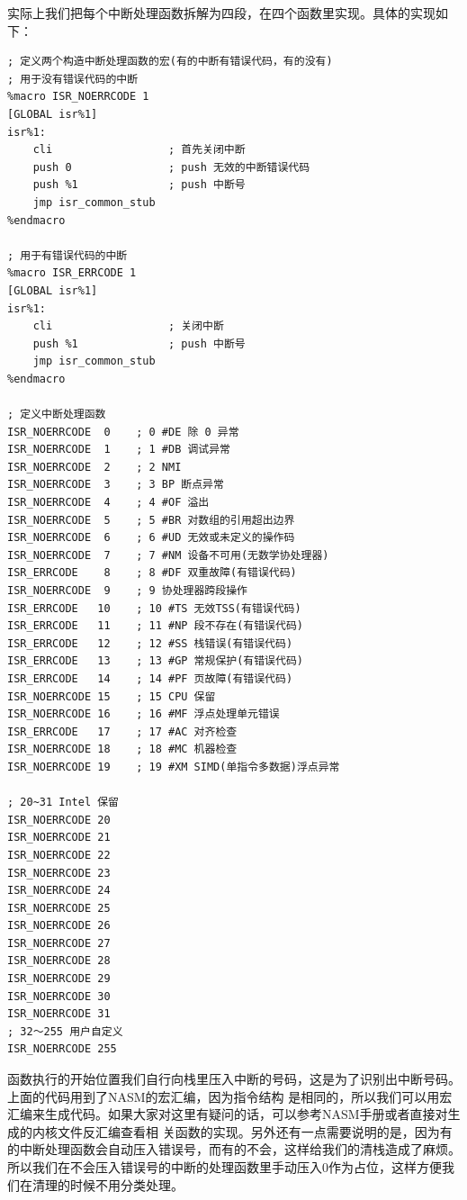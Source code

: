 \par 实际上我们把每个中断处理函数拆解为四段，在四个函数里实现。具体的实现如下：

\begin{lstlisting}[language = {[x86masm]Assembler}, caption = idt/idt\_s.s]
; 定义两个构造中断处理函数的宏(有的中断有错误代码，有的没有)
; 用于没有错误代码的中断
%macro ISR_NOERRCODE 1
[GLOBAL isr%1]
isr%1:
	cli                  ; 首先关闭中断
	push 0               ; push 无效的中断错误代码
	push %1              ; push 中断号
	jmp isr_common_stub
%endmacro

; 用于有错误代码的中断
%macro ISR_ERRCODE 1
[GLOBAL isr%1]
isr%1:
	cli                  ; 关闭中断
	push %1              ; push 中断号
	jmp isr_common_stub
%endmacro

; 定义中断处理函数
ISR_NOERRCODE  0 	; 0 #DE 除 0 异常
ISR_NOERRCODE  1 	; 1 #DB 调试异常
ISR_NOERRCODE  2 	; 2 NMI
ISR_NOERRCODE  3 	; 3 BP 断点异常 
ISR_NOERRCODE  4 	; 4 #OF 溢出 
ISR_NOERRCODE  5 	; 5 #BR 对数组的引用超出边界 
ISR_NOERRCODE  6 	; 6 #UD 无效或未定义的操作码 
ISR_NOERRCODE  7 	; 7 #NM 设备不可用(无数学协处理器) 
ISR_ERRCODE    8 	; 8 #DF 双重故障(有错误代码) 
ISR_NOERRCODE  9 	; 9 协处理器跨段操作
ISR_ERRCODE   10 	; 10 #TS 无效TSS(有错误代码) 
ISR_ERRCODE   11 	; 11 #NP 段不存在(有错误代码) 
ISR_ERRCODE   12 	; 12 #SS 栈错误(有错误代码) 
ISR_ERRCODE   13 	; 13 #GP 常规保护(有错误代码) 
ISR_ERRCODE   14 	; 14 #PF 页故障(有错误代码) 
ISR_NOERRCODE 15 	; 15 CPU 保留 
ISR_NOERRCODE 16 	; 16 #MF 浮点处理单元错误 
ISR_ERRCODE   17 	; 17 #AC 对齐检查 
ISR_NOERRCODE 18 	; 18 #MC 机器检查 
ISR_NOERRCODE 19 	; 19 #XM SIMD(单指令多数据)浮点异常

; 20~31 Intel 保留
ISR_NOERRCODE 20
ISR_NOERRCODE 21
ISR_NOERRCODE 22
ISR_NOERRCODE 23
ISR_NOERRCODE 24
ISR_NOERRCODE 25
ISR_NOERRCODE 26
ISR_NOERRCODE 27
ISR_NOERRCODE 28
ISR_NOERRCODE 29
ISR_NOERRCODE 30
ISR_NOERRCODE 31
; 32～255 用户自定义
ISR_NOERRCODE 255
\end{lstlisting}

\par 函数执行的开始位置我们自行向栈里压入中断的号码，这是为了识别出中断号码。上面的代码用到了NASM的宏汇编，因为指令结构\allowbreak
是相同的，所以我们可以用宏汇编来生成代码。如果大家对这里有疑问的话，可以参考NASM手册或者直接对生成的内核文件反汇编查看相\allowbreak
关函数的实现。另外还有一点需要说明的是，因为有的中断处理函数会自动压入错误号，而有的不会，这样给我们的清栈造成了麻烦。\allowbreak
所以我们在不会压入错误号的中断的处理函数里手动压入0作为占位，这样方便我们在清理的时候不用分类处理。

